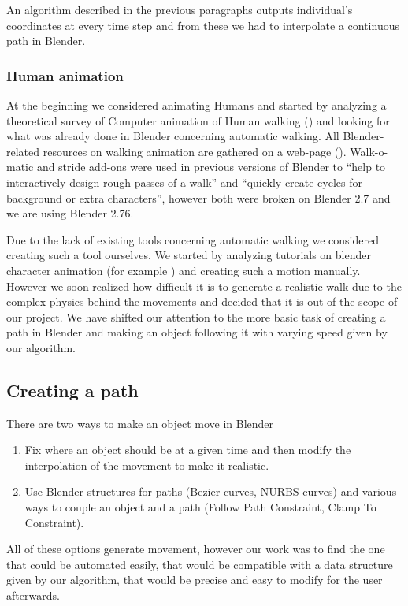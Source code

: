 An algorithm described in the previous paragraphs outputs individual's coordinates at every time step and from these we had to interpolate a continuous path in Blender. 

\subsubsection{Human animation}

At the beginning we considered animating Humans and started by analyzing a theoretical survey of Computer animation of Human walking (\cite{th_walking}) and looking for what was already done in Blender concerning automatic walking. All Blender-related resources on walking animation are gathered on a web-page (\cite{blwikiwalking}). Walk-o-matic and stride add-ons were used in previous versions of Blender to ``help to interactively design rough passes of a walk'' and ``quickly create cycles for background or extra characters'', however both were broken on Blender 2.7 and we are using Blender 2.76. 

Due to the lack of existing tools concerning automatic walking we considered creating such a tool ourselves. We started by analyzing tutorials on blender character animation (for example \cite{tuto_walk}) and creating such a motion manually. However we soon realized how difficult it is to generate a realistic walk due to the complex physics behind the movements and decided that it is out of the scope of our project. We have shifted our attention to the more basic task of creating a path in Blender and making an object following it with varying speed given by our algorithm.

\subsection{Creating a path}

There are two ways to make an object move in Blender
\begin{enumerate}
\item Fix where an object should be at a given time and then modify the interpolation of the movement to make it realistic.  
\item Use Blender structures for paths (Bezier curves, NURBS curves) and various ways to couple an object and a path (Follow Path Constraint, Clamp To Constraint).
\end{enumerate} 

All of these options generate movement, however our work was to find the one that could be automated easily, that would be compatible with a data structure given by our algorithm, that would be precise and easy to modify for the user afterwards. 

